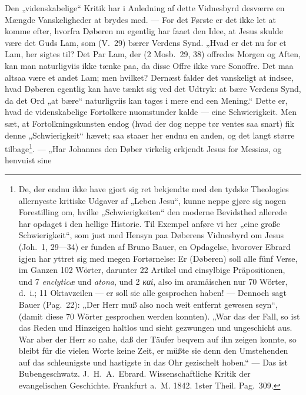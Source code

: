 \documentclass[12pt,a4paper]{book}
\begin{document}
Den „videnskabelige“ Kritik har i Anledning af dette Vidnesbyrd desværre en Mængde
Vanskeligheder at brydes med. --- For det Første er det ikke let at komme efter, hvorfra
Døberen nu egentlig har faaet den Idee, at Jesus skulde være det Guds Lam, som (V.\ 29)
bærer Verdens Synd. „Hvad er det nu for et Lam, her sigtes til? Det Par Lam, der (2
Mosb.\ 29, 38) offredes Morgen og Aften, kan man naturligviis ikke tænke paa, da disse
Offre ikke vare Sonoffre. Det maa altsaa være et andet Lam; men hvilket? Dernæst falder
det vanskeligt at indsee, hvad Døberen egentlig kan have tænkt sig ved det Udtryk: at
bære Verdens
Synd, da det Ord „at bære“ naturligviis kan tages i mere end een Mening.“ Dette er, hvad
de videnskabelige Fortolkere nuomstunder kalde --- eine Schwierigkeit. Men sæt, at
Fortolkningskunsten endog (hvad der dog neppe tør ventes saa snart) fik denne
„Schwierigkeit“ hævet; saa staaer her endnu en anden, og det langt større
%
%
tilbage\footnote{%
  De, der endnu ikke have gjort sig ret bekjendte med den tydske Theologies allernyeste
  kritiske Udgaver af „Leben Jesu“, kunne neppe gjøre sig nogen Forestilling om, hvilke
  „Schwierigkeiten“ den moderne Bevidsthed allerede har opdaget i den hellige Historie.
  Til Exempel anføre vi her „eine große Schwierigkeit“, som just med Hensyn paa Døberens
  Vidnesbyrd om Jesus (Joh.\ 1, 29---34) er funden af Bruno Bauer, en Opdagelse, hvorover
  Ebrard igjen har yttret sig med megen Fortørnelse: Er (Døberen) soll alle fünf Verse,
  im Ganzen 102 Wörter, darunter 22 Artikel und einsylbige Präpositionen, und 7
  \textit{enclyticæ} und \textit{atona}, und 2 \textit{καί}, also im aramäischen nur 70
  Wörter, d.\ i.; 11 Oktavzeilen --- er soll sie alle gesprochen haben! --- Dennoch sagt
  Bauer (Pag.\ 22): „Der Herr muß also noch weit entfernt gewesen seyn“, (damit diese 70
  Wörter gesprochen werden konnten). „War das der Fall, so ist das Reden und Hinzeigen
  haltlos und sieht gezwungen und ungeschicht aus. War aber der Herr so nahe, daß der
  Täufer beqvem auf ihn zeigen konnte, so bleibt für die vielen Worte keine Zeit, er
  müßte sie denn den Umstehenden auf das schleunigste und hastigste in das Ohr gezischelt
  hoben.“ --- Das ist Bubengeschwatz. J.\ H.\ A.\ Ebrard. Wissenschaftliche Kritik der
  evangelischen Geschichte. Frankfurt a.\ M. 1842. 1ster Theil. Pag.\ 309.%
}. --- „Har Johannes den Døber virkelig erkjendt Jesus for Messias, og henvuist sine
\end{document}
